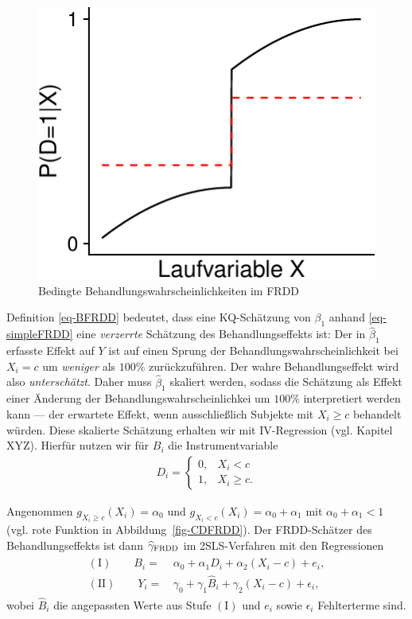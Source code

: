 \documentclass[
  a4paper,
  DIV=11,
  oneside]{scrreprt}
\begin{document}
\begin{figure}[t]

{\centering \includegraphics{RDD_files/figure-pdf/fig-FRDDprobD-1.pdf}

}

\caption{\label{fig-FRDDprobD}Bedingte Behandlungswahrscheinlichkeiten
im FRDD}

\end{figure}

Definition \eqref{eq-BFRDD} bedeutet, dass eine KQ-Schätzung von
\(\beta_1\) anhand \eqref{eq-simpleFRDD} eine \emph{verzerrte} Schätzung
des Behandlungseffekts ist: Der in \(\widehat{\beta}_1\) erfasste Effekt
auf \(Y\) ist auf einen Sprung der Behandlungswahrscheinlichkeit bei
\(X_i = c\) um \emph{weniger} als \(100\%\) zurückzuführen. Der wahre
Behandlungseffekt wird also \emph{unterschätzt}. Daher muss
\(\widehat{\beta}_1\) skaliert werden, sodass die Schätzung als Effekt
einer Änderung der Behandlungswahrscheinlichkei um \(100\%\)
interpretiert werden kann --- der erwartete Effekt, wenn ausschließlich
Subjekte mit \(X_i\geq c\) behandelt würden. Diese skalierte Schätzung
erhalten wir mit IV-Regression (vgl. Kapitel XYZ). Hierfür nutzen wir
für \(B_i\) die Instrumentvariable \begin{align*}
  D_i = \begin{cases}
    0, & X_i < c \\ 
    1, & X_i \geq c.
  \end{cases}
\end{align*}

Angenommen \(g_{X_i\geq c}(X_i) = \alpha_0\) und
\(g_{X_i<c}(X_i) = \alpha_0 + \alpha_1\) mit \(\alpha_0 + \alpha_1 < 1\)
(vgl. rote Funktion in Abbildung~\ref{fig-CDFRDD}). Der FRDD-Schätzer
des Behandlungseffekts ist dann \(\widehat{\gamma}_\textup{FRDD}\) im
2SLS-Verfahren mit den Regressionen \begin{align}
  \begin{split}
  (\mathrm{I})\qquad B_i =&\, \alpha_0 + \alpha_1 D_i + \alpha_2 (X_i - c) + e_i,\\
  (\mathrm{II})\qquad Y_i =&\, \gamma_0 + \gamma_1 \widehat{B}_i + \gamma_2 (X_i - c) + \epsilon_i,
  \end{split}\label{eq:FRDD_simpleIV}
\end{align} wobei \(\widehat{B}_i\) die angepassten Werte aus Stufe
\((\mathrm I)\) und \(e_i\) sowie \(\epsilon_i\) Fehlterterme sind.
\end{document}

